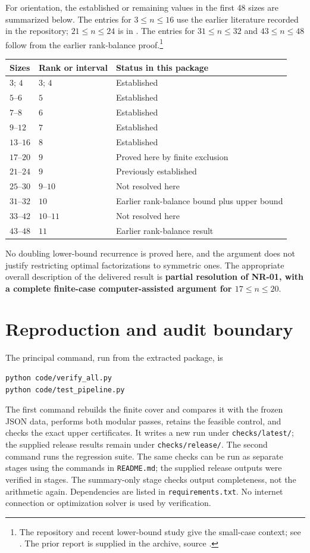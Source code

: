 \documentclass[11pt]{article}
\theoremstyle{definition}
\begin{document}
For orientation, the established or remaining values in the first 48 sizes are summarized below. The entries for $3\le n\le16$ use the earlier literature recorded in the repository; $21\le n\le24$ is in \cite{vgg}. The entries for $31\le n\le32$ and $43\le n\le48$ follow from the earlier rank-balance proof.\footnote{The repository and recent lower-bound study give the small-case context; see \cite{repo,bvg}. The prior report is supplied in the archive, source \cite{prior}.}
\begin{center}
\begin{tabular}{lll}
\toprule
Sizes&Rank or interval&Status in this package\\\midrule
$3$; $4$&$3$; $4$&Established\\
$5$--$6$&$5$&Established\\
$7$--$8$&$6$&Established\\
$9$--$12$&$7$&Established\\
$13$--$16$&$8$&Established\\
$17$--$20$&$9$&Proved here by finite exclusion\\
$21$--$24$&$9$&Previously established\\
$25$--$30$&$9$--$10$&Not resolved here\\
$31$--$32$&$10$&Earlier rank-balance bound plus upper bound\\
$33$--$42$&$10$--$11$&Not resolved here\\
$43$--$48$&$11$&Earlier rank-balance result\\\bottomrule
\end{tabular}
\end{center}
No doubling lower-bound recurrence is proved here, and the argument does not justify restricting optimal factorizations to symmetric ones. The appropriate overall description of the delivered result is \textbf{partial resolution of NR-01, with a complete finite-case computer-assisted argument for $17\le n\le20$}.

\section{Reproduction and audit boundary}
The principal command, run from the extracted package, is
\begin{verbatim}
python code/verify_all.py
python code/test_pipeline.py
\end{verbatim}
The first command rebuilds the finite cover and compares it with the frozen JSON data, performs both modular passes, retains the feasible control, and checks the exact upper certificates. It writes a new run under \texttt{checks/latest/}; the supplied release results remain under \texttt{checks/release/}. The second command runs the regression suite. The same checks can be run as separate stages using the commands in \texttt{README.md}; the supplied release outputs were verified in stages. The summary-only stage checks output completeness, not the arithmetic again. Dependencies are listed in \texttt{requirements.txt}. No internet connection or optimization solver is used by verification.
\end{document}
